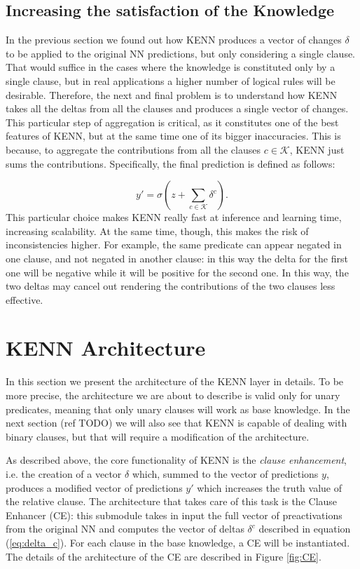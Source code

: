 \subsection{Increasing the satisfaction of the Knowledge}
In the previous section we found out how KENN produces a vector of changes $\delta$ to be applied to the original NN predictions, but only considering a single clause. That would suffice in the cases where the knowledge is constituted only by a single clause, but in real applications a higher number of logical rules will be desirable. Therefore, the next and final problem is to understand how KENN takes all the deltas from all the clauses and produces a single vector of changes. This particular step of aggregation is critical, as it constitutes one of the best features of KENN, but at the same time one of its bigger inaccuracies. This is because, to aggregate the contributions from all the clauses $c \in \mathcal{K}$, KENN just sums the contributions. Specifically, the final prediction is defined as follows:

\begin{equation}
\label{eq:deltas_sum}
y'=\sigma(z + \sum_{c\in\mathcal{K}}\delta^c).
\end{equation}
This particular choice makes KENN really fast at inference and learning time, increasing scalability. At the same time, though, this makes the risk of inconsistencies higher. For example, the same predicate can appear negated in one clause, and not negated in another clause: in this way the delta for the first one will be negative while it will be positive for the second one. In this way, the two deltas may cancel out rendering the contributions of the two clauses less effective.


\section{KENN Architecture}
In this section we present the architecture of the KENN layer in details. To be more precise, the architecture we are about to describe is valid only for unary predicates, meaning that only unary clauses will work as base knowledge. In the next section (ref TODO) we will also see that KENN is capable of dealing with binary clauses, but that will require a modification of the architecture. 

As described above, the core functionality of KENN is the \textit{clause enhancement}, i.e. the creation of a vector $\delta$ which, summed to the vector of predictions $y$, produces a modified vector of predictions $y'$ which increases the truth value of the relative clause. The architecture that takes care of this task is the Clause Enhancer (CE): this submodule takes in input the full vector of preactivations from the original NN and computes the vector of deltas $\delta^c$ described in equation (\ref{eq:delta_c}). For each clause in the base knowledge, a CE will be instantiated. The details of the architecture of the CE are described in Figure \ref{fig:CE}.

